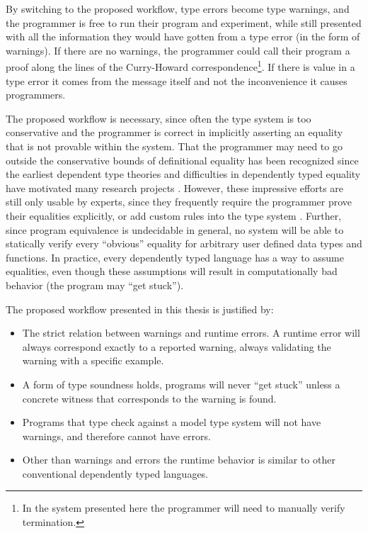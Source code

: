 
By switching to the proposed workflow, type errors become type warnings, and the programmer is free to run their program and experiment, while still presented with all the information they would have gotten from a type error (in the form of warnings).
If there are no warnings, the programmer could call their program a proof along the lines of the Curry-Howard correspondence\footnote{
  In the system presented here the programmer will need to manually verify termination.
}.
If there is value in a type error it comes from the message itself and not the inconvenience it causes programmers.

The proposed workflow is necessary, since often the type system is too conservative and the programmer is correct in implicitly asserting an equality that is not provable within the system.
That the programmer may need to go outside the conservative bounds of definitional equality has been recognized since the earliest dependent type theories \cite{Martin-Lof-1972} and difficulties in dependently typed equality have motivated many research projects \cite{HoTTbook,sjoberg2015programming,cockx2021taming}.
However, these impressive efforts are still only usable by experts, since they frequently require the programmer prove their equalities explicitly\cite{HoTTbook,sjoberg2015programming}, or add custom rules into the type system \cite{cockx2021taming}.
Further, since program equivalence is undecidable in general, no system will be able to statically verify every ``obvious'' equality for arbitrary user defined data types and functions.
In practice, every dependently typed language has a way to assume equalities, even though these assumptions will result in computationally bad behavior (the program may ``get stuck'').

The proposed workflow presented in this thesis is justified by:
\begin{itemize}
\item The strict relation between warnings and runtime errors.
A runtime error will always correspond exactly to a reported warning, always validating the warning with a specific example.
\item A form of type soundness holds, programs will never ``get stuck'' unless a concrete witness that corresponds to the warning is found.
\item Programs that type check against a model type system will not have warnings, and therefore cannot have errors.
\item Other than warnings and errors the runtime behavior is similar to other conventional dependently typed languages.
\end{itemize}


